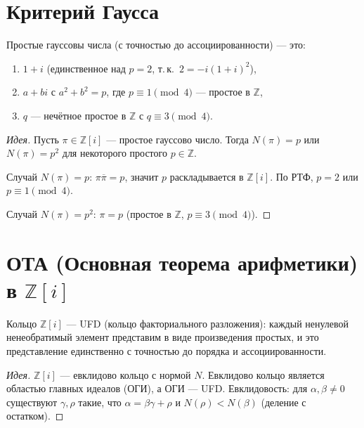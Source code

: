 \documentclass[12pt]{article}
\begin{document}
\section{Критерий Гаусса}

\begin{theorem}
Простые гауссовы числа (с точностью до ассоциированности) --- это:
\begin{enumerate}[(1)]
\item $1 + i$ (единственное над $p=2$, т.\,к.\ $2 = -i(1+i)^2$),
\item $a + bi$ с $a^2 + b^2 = p$, где $p \equiv 1 \pmod 4$ --- простое в $\mathbb{Z}$,
\item $q$ --- нечётное простое в $\mathbb{Z}$ с $q \equiv 3 \pmod 4$.
\end{enumerate}
\end{theorem}

\begin{proof}[Идея]
Пусть $\pi \in \mathbb{Z}[i]$ --- простое гауссово число.
Тогда $N(\pi) = p$ или $N(\pi) = p^2$ для некоторого простого $p \in \mathbb{Z}$.

Случай $N(\pi) = p$: $\pi\overline{\pi} = p$, значит $p$ раскладывается
в $\mathbb{Z}[i]$. По РТФ, $p = 2$ или $p \equiv 1 \pmod 4$.

Случай $N(\pi) = p^2$: $\pi = p$ (простое в $\mathbb{Z}$, $p\equiv 3\pmod 4$).
\end{proof}

\section{ОТА (Основная теорема арифметики) в $\mathbb{Z}[i]$}

\begin{theorem}
Кольцо $\mathbb{Z}[i]$ --- UFD (кольцо факториального разложения):
каждый ненулевой ненеобратимый элемент представим в виде произведения
простых, и это представление единственно с точностью до порядка
и ассоциированности.
\end{theorem}

\begin{proof}[Идея]
$\mathbb{Z}[i]$ --- евклидово кольцо с нормой $N$. Евклидово кольцо
является областью главных идеалов (ОГИ), а ОГИ --- UFD.
Евклидовость: для $\alpha, \beta \neq 0$ существуют $\gamma, \rho$ такие,
что $\alpha = \beta\gamma + \rho$ и $N(\rho) < N(\beta)$
(деление с остатком).
\end{proof}
\end{document}
